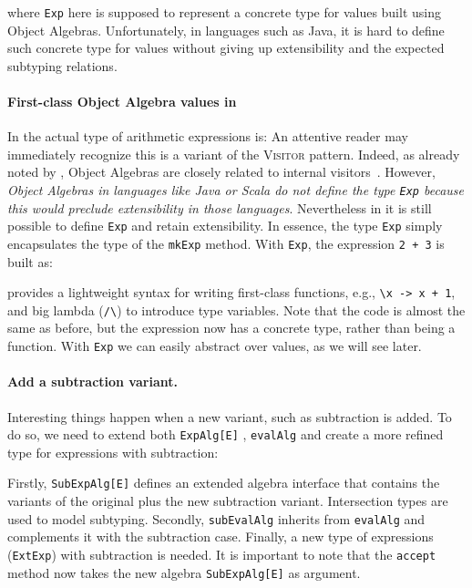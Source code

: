 \noindent where \lstinline{Exp} here is supposed to represent a
concrete type for values built using Object Algebras. Unfortunately, in languages
such as Java, it is hard to define such concrete type for values
without giving up extensibility and the expected subtyping  relations.

\paragraph{First-class Object Algebra values in \name}
In \name the actual type of arithmetic expressions is:
An attentive reader may immediately recognize this is a variant of the \textsc{Visitor}
pattern. Indeed, as already noted by \citeauthor{oliveira2012extensibility}, Object
Algebras are closely related to internal visitors~\cite{Oliveira_2008}. However, \emph{Object
Algebras in languages like Java or Scala do not define the type
\lstinline{Exp} because this would preclude extensibility in those
languages}. Nevertheless in \name it is still possible to define
\lstinline{Exp} and retain extensibility. In essence, the type
\lstinline{Exp} simply encapsulates the type
of the \lstinline{mkExp} method. With \lstinline{Exp}, the expression \lstinline{2 + 3} is
built as:


\noindent \name provides a lightweight syntax for writing first-class functions,
e.g., \lstinline{\x -> x + 1}, and big lambda (\lstinline{/\}) to introduce type
variables. Note that the code is almost the same as before, but the expression
now has a concrete type, rather than being a function. With \lstinline{Exp} we
can easily abstract over values, as we will see later.


\paragraph{Add a subtraction variant.} Interesting things happen when a new
variant, such as subtraction is added. To do so, we need to extend both
\lstinline{ExpAlg[E]} , \lstinline{evalAlg} and create a more refined type for
expressions with subtraction:


\noindent Firstly, \lstinline{SubExpAlg[E]} defines an extended algebra interface that
contains the variants of the original plus the new subtraction variant.
Intersection types are used to model subtyping. Secondly, \lstinline{subEvalAlg}
inherits from \lstinline{evalAlg} and complements it with the subtraction case.
Finally, a new type of expressions (\lstinline{ExtExp}) with subtraction is
needed. It is important to note that the \lstinline{accept} method now takes the
new algebra \lstinline{SubExpAlg[E]} as argument.

